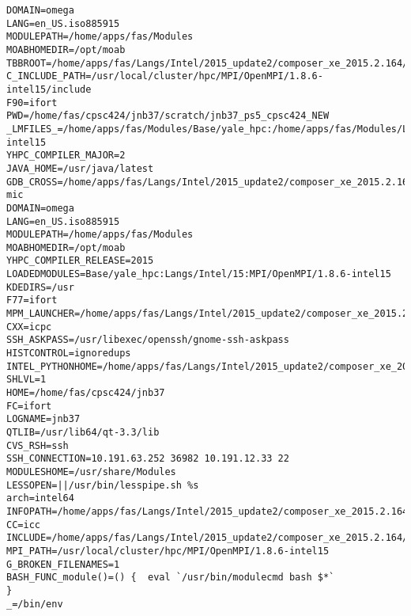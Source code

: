 \documentclass[11pt]{article}
\begin{document}
\begin{verbatim}
DOMAIN=omega
LANG=en_US.iso885915
MODULEPATH=/home/apps/fas/Modules
MOABHOMEDIR=/opt/moab
TBBROOT=/home/apps/fas/Langs/Intel/2015_update2/composer_xe_2015.2.164/tbb
C_INCLUDE_PATH=/usr/local/cluster/hpc/MPI/OpenMPI/1.8.6-intel15/include
F90=ifort
PWD=/home/fas/cpsc424/jnb37/scratch/jnb37_ps5_cpsc424_NEW
_LMFILES_=/home/apps/fas/Modules/Base/yale_hpc:/home/apps/fas/Modules/Langs/Intel/15:/home/apps/fas/Modules/MPI/OpenMPI/1.8.6-intel15
YHPC_COMPILER_MAJOR=2
JAVA_HOME=/usr/java/latest
GDB_CROSS=/home/apps/fas/Langs/Intel/2015_update2/composer_xe_2015.2.164/debugger/gdb/intel64_mic/bin/gdb-mic
DOMAIN=omega
LANG=en_US.iso885915
MODULEPATH=/home/apps/fas/Modules
MOABHOMEDIR=/opt/moab
YHPC_COMPILER_RELEASE=2015
LOADEDMODULES=Base/yale_hpc:Langs/Intel/15:MPI/OpenMPI/1.8.6-intel15
KDEDIRS=/usr
F77=ifort
MPM_LAUNCHER=/home/apps/fas/Langs/Intel/2015_update2/composer_xe_2015.2.164/debugger/mpm/bin/start_mpm.sh
CXX=icpc
SSH_ASKPASS=/usr/libexec/openssh/gnome-ssh-askpass
HISTCONTROL=ignoredups
INTEL_PYTHONHOME=/home/apps/fas/Langs/Intel/2015_update2/composer_xe_2015.2.164/debugger/python/intel64/
SHLVL=1
HOME=/home/fas/cpsc424/jnb37
FC=ifort
LOGNAME=jnb37
QTLIB=/usr/lib64/qt-3.3/lib
CVS_RSH=ssh
SSH_CONNECTION=10.191.63.252 36982 10.191.12.33 22
MODULESHOME=/usr/share/Modules
LESSOPEN=||/usr/bin/lesspipe.sh %s
arch=intel64
INFOPATH=/home/apps/fas/Langs/Intel/2015_update2/composer_xe_2015.2.164/debugger/gdb/intel64/share/info/:/home/apps/fas/Langs/Intel/2015_update2/composer_xe_2015.2.164/debugger/gdb/intel64_mic/share/info/
CC=icc
INCLUDE=/home/apps/fas/Langs/Intel/2015_update2/composer_xe_2015.2.164/mkl/include
MPI_PATH=/usr/local/cluster/hpc/MPI/OpenMPI/1.8.6-intel15
G_BROKEN_FILENAMES=1
BASH_FUNC_module()=() {  eval `/usr/bin/modulecmd bash $*`
}
_=/bin/env
\end{verbatim}
\end{document}
